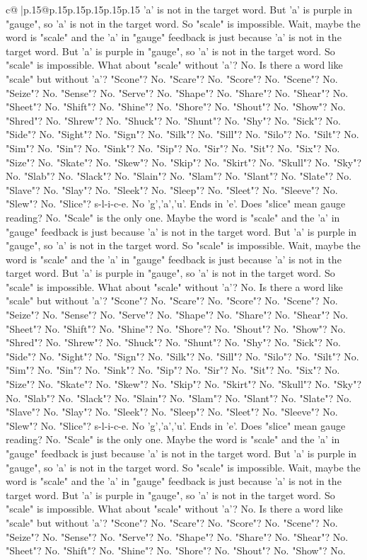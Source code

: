 \documentclass{article}
\begin{document}
{\begin{supertabular}{c@{$\;$}|p{.15\linewidth}@{}p{.15\linewidth}p{.15\linewidth}p{.15\linewidth}p{.15\linewidth}p{.15\linewidth}}
{{{'a' is not in the target word. But 'a' is purple in "gauge", so 'a' is not in the target word. So "scale" is impossible. Wait, maybe the word is "scale" and the 'a' in "gauge" feedback is just because 'a' is not in the target word. But 'a' is purple in "gauge", so 'a' is not in the target word. So "scale" is impossible. What about "scale" without 'a'? No. Is there a word like "scale" but without 'a'? "Scone"? No. "Scare"? No. "Score"? No. "Scene"? No. "Seize"? No. "Sense"? No. "Serve"? No. "Shape"? No. "Share"? No. "Shear"? No. "Sheet"? No. "Shift"? No. "Shine"? No. "Shore"? No. "Shout"? No. "Show"? No. "Shred"? No. "Shrew"? No. "Shuck"? No. "Shunt"? No. "Shy"? No. "Sick"? No. "Side"? No. "Sight"? No. "Sign"? No. "Silk"? No. "Sill"? No. "Silo"? No. "Silt"? No. "Sim"? No. "Sin"? No. "Sink"? No. "Sip"? No. "Sir"? No. "Sit"? No. "Six"? No. "Size"? No. "Skate"? No. "Skew"? No. "Skip"? No. "Skirt"? No. "Skull"? No. "Sky"? No. "Slab"? No. "Slack"? No. "Slain"? No. "Slam"? No. "Slant"? No. "Slate"? No. "Slave"? No. "Slay"? No. "Sleek"? No. "Sleep"? No. "Sleet"? No. "Sleeve"? No. "Slew"? No. "Slice"? s{-}l{-}i{-}c{-}e. No 'g','a','u'. Ends in 'e'. Does "slice" mean gauge reading? No. "Scale" is the only one. Maybe the word is "scale" and the 'a' in "gauge" feedback is just because 'a' is not in the target word. But 'a' is purple in "gauge", so 'a' is not in the target word. So "scale" is impossible. Wait, maybe the word is "scale" and the 'a' in "gauge" feedback is just because 'a' is not in the target word. But 'a' is purple in "gauge", so 'a' is not in the target word. So "scale" is impossible. What about "scale" without 'a'? No. Is there a word like "scale" but without 'a'? "Scone"? No. "Scare"? No. "Score"? No. "Scene"? No. "Seize"? No. "Sense"? No. "Serve"? No. "Shape"? No. "Share"? No. "Shear"? No. "Sheet"? No. "Shift"? No. "Shine"? No. "Shore"? No. "Shout"? No. "Show"? No. "Shred"? No. "Shrew"? No. "Shuck"? No. "Shunt"? No. "Shy"? No. "Sick"? No. "Side"? No. "Sight"? No. "Sign"? No. "Silk"? No. "Sill"? No. "Silo"? No. "Silt"? No. "Sim"? No. "Sin"? No. "Sink"? No. "Sip"? No. "Sir"? No. "Sit"? No. "Six"? No. "Size"? No. "Skate"? No. "Skew"? No. "Skip"? No. "Skirt"? No. "Skull"? No. "Sky"? No. "Slab"? No. "Slack"? No. "Slain"? No. "Slam"? No. "Slant"? No. "Slate"? No. "Slave"? No. "Slay"? No. "Sleek"? No. "Sleep"? No. "Sleet"? No. "Sleeve"? No. "Slew"? No. "Slice"? s{-}l{-}i{-}c{-}e. No 'g','a','u'. Ends in 'e'. Does "slice" mean gauge reading? No. "Scale" is the only one. Maybe the word is "scale" and the 'a' in "gauge" feedback is just because 'a' is not in the target word. But 'a' is purple in "gauge", so 'a' is not in the target word. So "scale" is impossible. Wait, maybe the word is "scale" and the 'a' in "gauge" feedback is just because 'a' is not in the target word. But 'a' is purple in "gauge", so 'a' is not in the target word. So "scale" is impossible. What about "scale" without 'a'? No. Is there a word like "scale" but without 'a'? "Scone"? No. "Scare"? No. "Score"? No. "Scene"? No. "Seize"? No. "Sense"? No. "Serve"? No. "Shape"? No. "Share"? No. "Shear"? No. "Sheet"? No. "Shift"? No. "Shine"? No. "Shore"? No. "Shout"? No. "Show"? No. }}}
\end{supertabular}}
\end{document}
